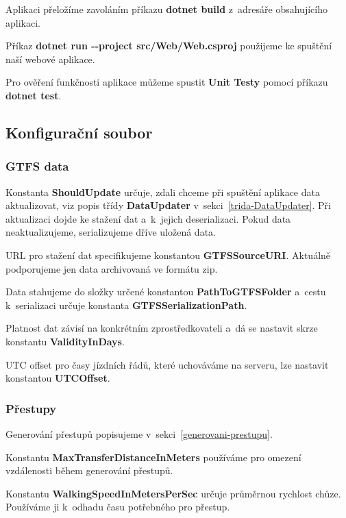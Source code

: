 Aplikaci přeložíme zavoláním příkazu \textbf{dotnet build} z~adresáře obsahujícího aplikaci.

Příkaz \textbf{dotnet run -{}-project src/Web/Web.csproj} použijeme ke spuštění naší webové aplikace.

Pro ověření funkčnosti aplikace můžeme spustit \textbf{Unit Testy} pomocí příkazu \textbf{dotnet test}.


\subsection{Konfigurační soubor}


\subsubsection{GTFS data}

Konstanta \textbf{ShouldUpdate} určuje, zdali chceme při spuštění aplikace data aktualizovat, viz popis třídy \textbf{DataUpdater} v~sekci~\ref{trida-DataUpdater}. Při aktualizaci dojde ke stažení dat a~k~jejich deserializaci. Pokud data neaktualizujeme, serializujeme dříve uložená data.

URL pro stažení dat specifikujeme konstantou \textbf{GTFSSourceURI}. Aktuálně podporujeme jen data archivovaná ve formátu zip.

Data stahujeme do složky určené konstantou \textbf{PathToGTFSFolder} a~cestu k~serializaci určuje konstanta \textbf{GTFSSerializationPath}.

Platnost dat závisí na konkrétním zprostředkovateli a~dá se nastavit skrze konstantu \textbf{ValidityInDays}.

UTC offset pro časy jízdních řádů, které uchováváme na serveru, lze nastavit konstantou \textbf{UTCOffset}.

\subsubsection{Přestupy}

Generování přestupů popisujeme v~sekci~\ref{generovani-prestupu}.

Konstantu \textbf{MaxTransferDistanceInMeters} používáme pro omezení vzdálenosti během generování přestupů.

Konstantu \textbf{WalkingSpeedInMetersPerSec} určuje průměrnou rychlost chůze. Používáme ji k~odhadu času potřebného pro přestup.

